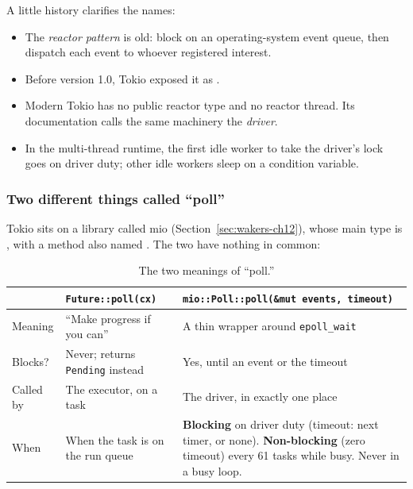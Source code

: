 A little history clarifies the names:

\begin{itemize}
    \item The \emph{reactor pattern} is old: block on an operating-system event queue, then dispatch each event to whoever registered interest.
    \item Before version 1.0, Tokio exposed it as .
    \item Modern Tokio has no public reactor type and no reactor thread. Its documentation calls the same machinery the \emph{driver}.
    \item In the multi-thread runtime, the first idle worker to take the driver's lock goes on driver duty; other idle workers sleep on a condition variable.
\end{itemize}

\subsubsection{Two different things called ``poll''}

Tokio sits on a library called mio (Section~\ref{sec:wakers-ch12}), whose main type is , with a method also named . The two have nothing in common:

\begin{table}[htbp]
    \centering\small
    \begin{tabularx}{\linewidth}{>{\raggedright\arraybackslash}p{1.8cm} >{\raggedright\arraybackslash}p{4.6cm} Y}
        \toprule
         & \textbf{\texttt{Future::poll(cx)}} & \textbf{\texttt{mio::Poll::poll(\&mut events, timeout)}} \\
        \midrule
        Meaning & ``Make progress if you can'' & A thin wrapper around \texttt{epoll\_wait} \\
        Blocks? & Never; returns \texttt{Pending} instead & Yes, until an event or the timeout \\
        Called by & The executor, on a task & The driver, in exactly one place \\
        When & When the task is on the run queue & \textbf{Blocking} on driver duty (timeout: next timer, or none). \textbf{Non-blocking} (zero timeout) every 61 tasks while busy. Never in a busy loop. \\
        \bottomrule
    \end{tabularx}
    \caption{The two meanings of ``poll.''}
    \label{tab:wakers-11.1}
\end{table}

